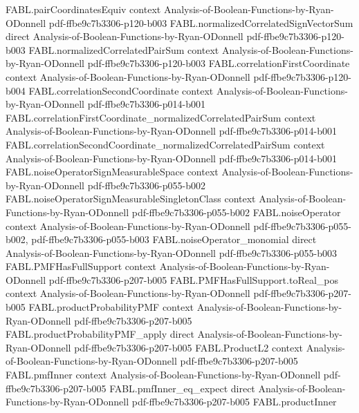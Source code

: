 \begin{theorem}
\proofstep
  {FABL.pairCoordinatesEquiv}
  {context}
  {Analysis-of-Boolean-Functions-by-Ryan-ODonnell}
  {pdf-ffbe9c7b3306-p120-b003}
\proofstep
  {FABL.normalizedCorrelatedSignVectorSum}
  {direct}
  {Analysis-of-Boolean-Functions-by-Ryan-ODonnell}
  {pdf-ffbe9c7b3306-p120-b003}
\proofstep
  {FABL.normalizedCorrelatedPairSum}
  {context}
  {Analysis-of-Boolean-Functions-by-Ryan-ODonnell}
  {pdf-ffbe9c7b3306-p120-b003}
\proofstep
  {FABL.correlationFirstCoordinate}
  {context}
  {Analysis-of-Boolean-Functions-by-Ryan-ODonnell}
  {pdf-ffbe9c7b3306-p120-b004}
\proofstep
  {FABL.correlationSecondCoordinate}
  {context}
  {Analysis-of-Boolean-Functions-by-Ryan-ODonnell}
  {pdf-ffbe9c7b3306-p014-b001}
\proofstep
  {FABL.correlationFirstCoordinate_normalizedCorrelatedPairSum}
  {context}
  {Analysis-of-Boolean-Functions-by-Ryan-ODonnell}
  {pdf-ffbe9c7b3306-p014-b001}
\proofstep
  {FABL.correlationSecondCoordinate_normalizedCorrelatedPairSum}
  {context}
  {Analysis-of-Boolean-Functions-by-Ryan-ODonnell}
  {pdf-ffbe9c7b3306-p014-b001}
\proofstep
  {FABL.noiseOperatorSignMeasurableSpace}
  {context}
  {Analysis-of-Boolean-Functions-by-Ryan-ODonnell}
  {pdf-ffbe9c7b3306-p055-b002}
\proofstep
  {FABL.noiseOperatorSignMeasurableSingletonClass}
  {context}
  {Analysis-of-Boolean-Functions-by-Ryan-ODonnell}
  {pdf-ffbe9c7b3306-p055-b002}
\proofstep
  {FABL.noiseOperator}
  {context}
  {Analysis-of-Boolean-Functions-by-Ryan-ODonnell}
  {pdf-ffbe9c7b3306-p055-b002,
    pdf-ffbe9c7b3306-p055-b003}
\proofstep
  {FABL.noiseOperator_monomial}
  {direct}
  {Analysis-of-Boolean-Functions-by-Ryan-ODonnell}
  {pdf-ffbe9c7b3306-p055-b003}
\proofstep
  {FABL.PMFHasFullSupport}
  {context}
  {Analysis-of-Boolean-Functions-by-Ryan-ODonnell}
  {pdf-ffbe9c7b3306-p207-b005}
\proofstep
  {FABL.PMFHasFullSupport.toReal_pos}
  {context}
  {Analysis-of-Boolean-Functions-by-Ryan-ODonnell}
  {pdf-ffbe9c7b3306-p207-b005}
\proofstep
  {FABL.productProbabilityPMF}
  {context}
  {Analysis-of-Boolean-Functions-by-Ryan-ODonnell}
  {pdf-ffbe9c7b3306-p207-b005}
\proofstep
  {FABL.productProbabilityPMF_apply}
  {direct}
  {Analysis-of-Boolean-Functions-by-Ryan-ODonnell}
  {pdf-ffbe9c7b3306-p207-b005}
\proofstep
  {FABL.ProductL2}
  {context}
  {Analysis-of-Boolean-Functions-by-Ryan-ODonnell}
  {pdf-ffbe9c7b3306-p207-b005}
\proofstep
  {FABL.pmfInner}
  {context}
  {Analysis-of-Boolean-Functions-by-Ryan-ODonnell}
  {pdf-ffbe9c7b3306-p207-b005}
\proofstep
  {FABL.pmfInner_eq_expect}
  {direct}
  {Analysis-of-Boolean-Functions-by-Ryan-ODonnell}
  {pdf-ffbe9c7b3306-p207-b005}
\proofstep
  {FABL.productInner}

\end{theorem}
